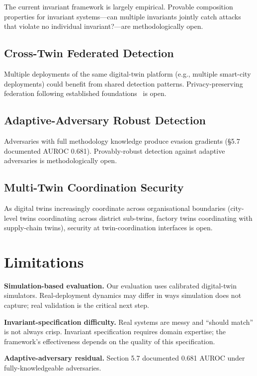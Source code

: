 \documentclass[sigconf,nonacm]{acmart}
\begin{document}
The current invariant framework is largely empirical. Provable
composition properties for invariant systems---can multiple
invariants jointly catch attacks that violate no individual
invariant?---are methodologically open.

\subsection{Cross-Twin Federated Detection}

Multiple deployments of the same digital-twin platform (e.g.,
multiple smart-city deployments) could benefit from shared
detection patterns. Privacy-preserving federation following
established foundations~\cite{kairouz2024fedml} is open.

\subsection{Adaptive-Adversary Robust Detection}

Adversaries with full methodology knowledge produce evasion
gradients (§5.7 documented AUROC 0.681). Provably-robust
detection against adaptive adversaries is methodologically open.

\subsection{Multi-Twin Coordination Security}

As digital twins increasingly coordinate across organisational
boundaries (city-level twins coordinating across district
sub-twins, factory twins coordinating with supply-chain twins),
security at twin-coordination interfaces is open.

\section{Limitations}

\textbf{Simulation-based evaluation.} Our evaluation uses
calibrated digital-twin simulators. Real-deployment dynamics may
differ in ways simulation does not capture; real validation is
the critical next step.

\textbf{Invariant-specification difficulty.} Real systems are
messy and ``should match'' is not always crisp. Invariant
specification requires domain expertise; the framework's
effectiveness depends on the quality of this specification.

\textbf{Adaptive-adversary residual.} Section 5.7 documented
0.681 AUROC under fully-knowledgeable adversaries.
\end{document}
